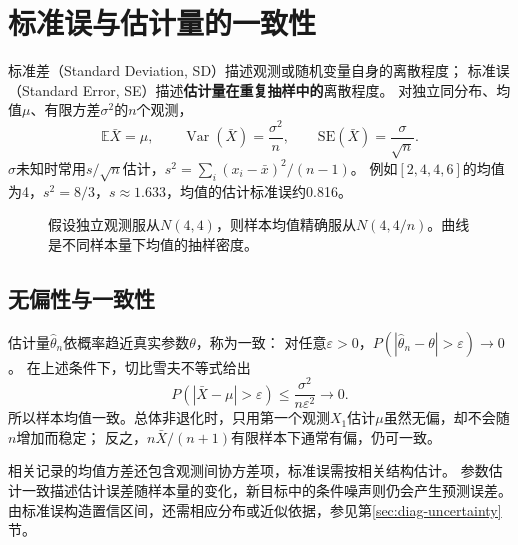 \section{标准误与估计量的一致性}
\label{sec:math-standard-error}
标准差（Standard Deviation, SD）描述观测或随机变量自身的离散程度；
标准误（Standard Error, SE）描述\textbf{估计量在重复抽样中的}离散程度。
对独立同分布、均值$\mu$、有限方差$\sigma^2$的$n$个观测，
\[
 \mathbb E\bar X=\mu,\qquad
 \operatorname{Var}(\bar X)=\frac{\sigma^2}{n},\qquad
 \mathrm{SE}(\bar X)=\frac{\sigma}{\sqrt n}.
\]
$\sigma$未知时常用$s/\sqrt n$估计，$s^2=\sum_i(x_i-\bar x)^2/(n-1)$。
例如$[2,4,4,6]$的均值为4，$s^2=8/3$，$s\approx1.633$，均值的估计标准误约0.816。

\begin{figure}[htbp]
\centering
\caption{假设独立观测服从$N(4,4)$，则样本均值精确服从$N(4,4/n)$。曲线是不同样本量下均值的抽样密度。}
\par\smallskip
{}
\end{figure}

\subsection{无偏性与一致性}
估计量$\hat\theta_n$依概率趋近真实参数$\theta$，称为一致：
对任意$\varepsilon>0$，$P(|\hat\theta_n-\theta|>\varepsilon)\to0$。
在上述条件下，切比雪夫不等式给出
\[
 P(|\bar X-\mu|>\varepsilon)\leq\frac{\sigma^2}{n\varepsilon^2}\longrightarrow0.
\]
所以样本均值一致。总体非退化时，只用第一个观测$X_1$估计$\mu$虽然无偏，却不会随$n$增加而稳定；
反之，$n\bar X/(n+1)$有限样本下通常有偏，仍可一致。

相关记录的均值方差还包含观测间协方差项，标准误需按相关结构估计。
参数估计一致描述估计误差随样本量的变化，新目标中的条件噪声则仍会产生预测误差。
由标准误构造置信区间，还需相应分布或近似依据，参见第\ref{sec:diag-uncertainty}节。

